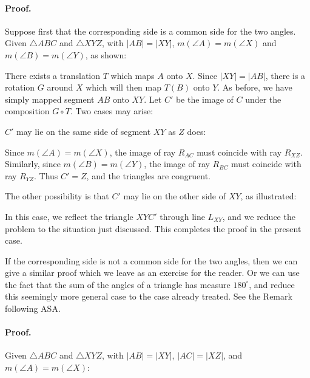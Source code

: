 \documentclass[12pt]{book} %
\begin{document}
\begin{ExerciseList}
\begin{ExerciseList}
\begin{ExerciseList}

\paragraph{Proof.}
Suppose first that the corresponding side is a common side for
the two angles. Given $\triangle ABC$ and $\triangle XYZ$, with $|AB| = |XY|$,
$m(\angle A) = m(\angle X)$ and $m(\angle B) = m(\angle Y)$, as shown:


There exists a translation $T$ which maps $A$ onto $X$. Since $|XY| = |AB|$,
there is a rotation $G$ around $X$ which will then map $T(B)$ onto $Y$. As
before, we have simply mapped segment $AB$ onto $XY$. Let $C'$ be the image of $C$
under the composition $G \circ T$. Two cases may arise:

$C'$ may lie on the same side of segment $XY$ as $Z$ does:


Since $m(\angle A) = m(\angle X)$, the image of ray $R_{AC}$ must coincide with ray
$R_{XZ}$. Similarly, since $m(\angle B) = m(\angle Y)$, the image of ray $R_{BC}$ must coincide with ray $R_{YZ}$. Thus $C' = Z$, and the triangles are congruent.

The other possibility is that $C'$ may lie on the other side of $XY$, as
illustrated:


In this case, we reflect the triangle $XYC'$ through line $L_{XY}$, and we reduce the problem to the situation just discussed. This completes the
proof in the present case.

If the corresponding side is not a common side for the two angles,
then we can give a similar proof which we leave as an exercise for the
reader. Or we can use the fact that the sum of the angles of a triangle
has measure $180^\circ$, and reduce this seemingly more general case to the
case already treated. See the Remark following ASA.


\paragraph{Proof.}
Given $\triangle ABC$ and $\triangle XYZ$, with $|AB| = |XY|$, $|AC| = |XZ|$,
and $m(\angle A) = m(\angle X)$:


\end{ExerciseList}
\end{ExerciseList}
\end{ExerciseList}
\end{document}
